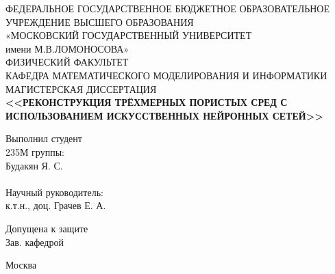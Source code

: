 \begin{titlepage} %
	
	\begin{center}
		\small{ФЕДЕРАЛЬНОЕ ГОСУДАРСТВЕННОЕ БЮДЖЕТНОЕ ОБРАЗОВАТЕЛЬНОЕ}\\ 
		УЧРЕЖДЕНИЕ ВЫСШЕГО ОБРАЗОВАНИЯ\\
		«МОСКОВСКИЙ ГОСУДАРСТВЕННЫЙ УНИВЕРСИТЕТ\\
		имени М.В.ЛОМОНОСОВА»\\
		\hfill \break
		ФИЗИЧЕСКИЙ ФАКУЛЬТЕТ \\
		\hfill \break
		КАФЕДРА МАТЕМАТИЧЕСКОГО МОДЕЛИРОВАНИЯ И ИНФОРМАТИКИ\\
		\hfill \break
		\hfill \break
		\hfill \break
		\hfill \break
		МАГИСТЕРСКАЯ ДИССЕРТАЦИЯ\\
		\hfill \break
		\textbf{<<РЕКОНСТРУКЦИЯ ТРЁХМЕРНЫХ ПОРИСТЫХ СРЕД С ИСПОЛЬЗОВАНИЕМ ИСКУССТВЕННЫХ НЕЙРОННЫХ СЕТЕЙ>>}\\
	\end{center}
	
	\hfill \break

	\begin{flushright}
		Выполнил студент \\
		235М группы:\\
		Будакян Я. С.\\
		\underline{\hspace{3cm}}\\
		\hfill \break
		Научный руководитель: \\
		к.т.н., доц. Грачев Е. А.\\
		\underline{\hspace{3cm}}
	\end{flushright}
	
	\begin{flushleft}
		Допущена к защите\\
		Зав. кафедрой \underline{\hspace{3cm}}\\
	\end{flushleft}
	\hfill \break
	\begin{center}
		Москва \\
		\hfill {}
	\end{center}
	
	\thispagestyle{empty} %
	

\end{titlepage}  %